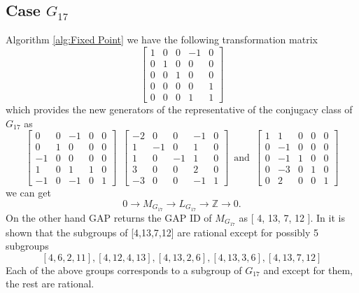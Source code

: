 \documentclass{article}
\theoremstyle{plain}
\theoremstyle{definition}
\newcommand{\Z}{\ensuremath{\mathbb{Z}}}
\newcommand{\tand}{\ensuremath{\,\,\, \text{and} \,\,\,}}
\newcommand{\exactseq}[1]{\ensuremath{0 \longrightarrow M_{#1} \longrightarrow L_{#1} \longrightarrow \Z \longrightarrow 0}}
\begin{document}
\subsection{Case $G_{17}$}
Algorithm \ref{alg:Fixed Point} we have the following transformation matrix 
$$
 \left[ \begin {array}{ccccc} 1&0&0&-1&0\\ 0&1&0&0&0
\\ 0&0&1&0&0\\ 0&0&0&0&1
\\ 0&0&0&1&1\end {array} \right] 
$$
which provides the new generators of the representative of the conjugacy class of $G_{17}$ as
$$
 \left[ \begin {array}{cccc|c} 0&0&-1&0&0\\  0&1&0&0&0
\\  -1&0&0&0&0\\  1&0&1&1&0
\\ \hline -1&0&-1&0&1\end {array} \right] 
\,\,\,
 \left[ \begin {array}{cccc|c} -2&0&0&-1&0\\  1&-1&0&1
&0\\  1&0&-1&1&0\\  3&0&0&2&0
\\ \hline -3&0&0&-1&1\end {array} \right] 
\tand
 \left[ \begin {array}{cccc|c} 1&1&0&0&0\\  0&-1&0&0&0
\\  0&-1&1&0&0\\  0&-3&0&1&0
\\ \hline 0&2&0&0&1\end {array} \right] 
$$
we can get 
$$\exactseq{G_{17}}.$$
On the other hand GAP returns the GAP ID of $M_{G_{17}}$  as [ 4, 13, 7, 12 ].
In \cite{Nicole1} it is shown that the subgroups of [4,13,7,12] are rational except for possibly 5 subgroups $$[4, 6, 2, 11], [4, 12, 4, 13], [4, 13, 2, 6], [4, 13, 3, 6], [4, 13, 7, 12]$$
Each of the above groups corresponds to a subgroup of $G_{17}$ and except for them, the rest are rational.
\end{document}
